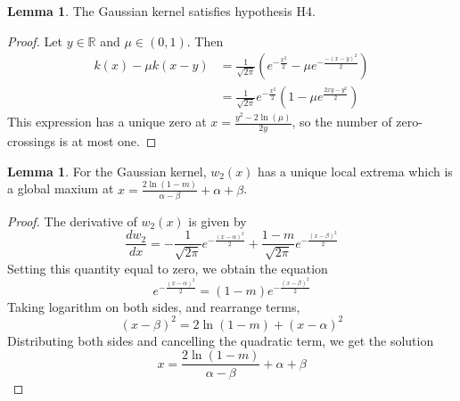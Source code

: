 \documentclass[11pt]{article}
\theoremstyle{definition}
\newtheorem{lem}[thm]{Lemma}
\numberwithin{equation}{section}
\numberwithin{thm}{section}
\begin{document}
\begin{lem}
The Gaussian kernel satisfies hypothesis H4.
\end{lem}

\begin{proof}
Let $y\in\mathbb R$ and $\mu\in(0,1)$. Then
\begin{equation} \begin{aligned}
k(x)-\mu k(x-y) &= \frac{1}{\sqrt{2\pi}} \left( e^{-\frac{x^2}{2}} - \mu e^{-\frac{-(x-y)^2}{2}} \right) \\
&= \frac{1}{\sqrt{2\pi}} e^{-\frac{x^2}{2}} \left( 1 - \mu e^{\frac{2xy-y^2}{2}} \right)
\end{aligned} \end{equation}
This expression has a unique zero at $x=\frac{y^2-2\ln(\mu)}{2y}$, so the number of zero-crossings is at most one.
\end{proof}

\begin{lem}
For the Gaussian kernel, $w_2(x)$ has a unique local extrema which is a global maxium at $x=\frac{2\ln(1-m)}{\alpha-\beta}+\alpha+\beta$.
\end{lem}

\begin{proof}
The derivative of $w_2(x)$ is given by
$$ 
\frac{dw_2}{dx} = -\frac{1}{\sqrt{2\pi}}e^{-\frac{(x-\alpha)^2}{2}} + \frac{1-m}{\sqrt{2\pi}}e^{-\frac{(x-\beta)^2}{2}}
$$
Setting this quantity equal to zero, we obtain the equation
$$ 
e^{-\frac{(x-\alpha)^2}{2}} = (1-m)e^{-\frac{(x-\beta)^2}{2}}
$$
Taking logarithm on both sides, and rearrange terms,
$$ 
(x-\beta)^2 = 2\ln(1-m) + (x-\alpha)^2
$$
Distributing both sides and cancelling the quadratic term, we get the solution
$$
x = \frac{2\ln(1-m)}{\alpha-\beta} + \alpha + \beta
$$
\end{proof}
\end{document}

